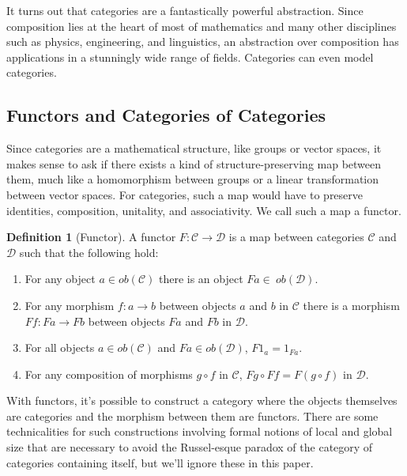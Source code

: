 \documentclass{article}
\theoremstyle{definition}
\newtheorem{definition}{Definition}
\begin{document}
It turns out that categories are a fantastically powerful abstraction.
Since composition lies at the heart of most of mathematics and many other disciplines such as physics, engineering, and linguistics, an abstraction over composition has applications in a stunningly wide range of fields.
Categories can even model categories.

\subsection*{Functors and Categories of Categories}
Since categories are a mathematical structure, like groups or vector spaces, it makes sense to ask if there exists a kind of structure-preserving map between them, much like a homomorphism between groups or a linear transformation between vector spaces.
For categories, such a map would have to preserve identities, composition, unitality, and associativity.
We call such a map a functor.
\begin{definition}[Functor]
    A functor $F:\mathcal{C}\rightarrow\mathcal{D}$ is a map between categories $\mathcal{C}$ and $\mathcal{D}$ such that the following hold:
    \begin{enumerate}
        \item For any object $a\in ob(\mathcal{C})$ there is an object $Fa\in\ ob(\mathcal{D})$.
        \item For any morphism $f:a\rightarrow b$ between objects $a$ and $b$ in $\mathcal{C}$ there is a morphism $Ff:Fa\rightarrow Fb$ between objects $Fa$ and  $Fb$ in $\mathcal{D}$.
        \item For all objects $a\in ob(\mathcal{C})$ and $Fa\in ob(\mathcal{D})$, $F1_a=1_{Fa}$.
        \item For any composition of morphisms $g\circ f$ in $\mathcal{C}$, $Fg\circ Ff=F(g\circ f)$ in $\mathcal{D}$.
    \end{enumerate}
\end{definition}
With functors, it's possible to construct a category where the objects themselves are categories and the morphism between them are functors.
There are some technicalities for such constructions involving formal notions of local and global size that are necessary to avoid the Russel-esque paradox of the category of categories containing itself, but we'll ignore these in this paper.
\end{document}
